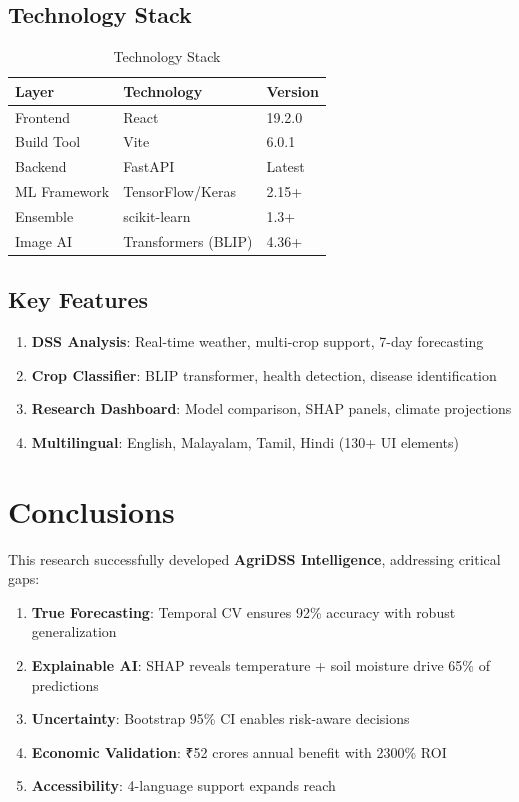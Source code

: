 \documentclass[conference,11pt]{IEEEtran}
\begin{document}
\subsection{Technology Stack}

\begin{table}[h]
\centering
\caption{Technology Stack}
\begin{tabular}{|l|l|l|}
\hline
\textbf{Layer} & \textbf{Technology} & \textbf{Version} \\
\hline
Frontend & React & 19.2.0 \\
\hline
Build Tool & Vite & 6.0.1 \\
\hline
Backend & FastAPI & Latest \\
\hline
ML Framework & TensorFlow/Keras & 2.15+ \\
\hline
Ensemble & scikit-learn & 1.3+ \\
\hline
Image AI & Transformers (BLIP) & 4.36+ \\
\hline
\end{tabular}
\end{table}

\subsection{Key Features}

\begin{enumerate}
    \item \textbf{DSS Analysis}: Real-time weather, multi-crop support, 7-day forecasting
    \item \textbf{Crop Classifier}: BLIP transformer, health detection, disease identification
    \item \textbf{Research Dashboard}: Model comparison, SHAP panels, climate projections
    \item \textbf{Multilingual}: English, Malayalam, Tamil, Hindi (130+ UI elements)
\end{enumerate}

\section{Conclusions}

This research successfully developed \textbf{AgriDSS Intelligence}, addressing critical gaps:

\begin{enumerate}
    \item \textbf{True Forecasting}: Temporal CV ensures 92\% accuracy with robust generalization
    \item \textbf{Explainable AI}: SHAP reveals temperature + soil moisture drive 65\% of predictions
    \item \textbf{Uncertainty}: Bootstrap 95\% CI enables risk-aware decisions
    \item \textbf{Economic Validation}: ₹52 crores annual benefit with 2300\% ROI
    \item \textbf{Accessibility}: 4-language support expands reach
\end{enumerate}
\end{document}
